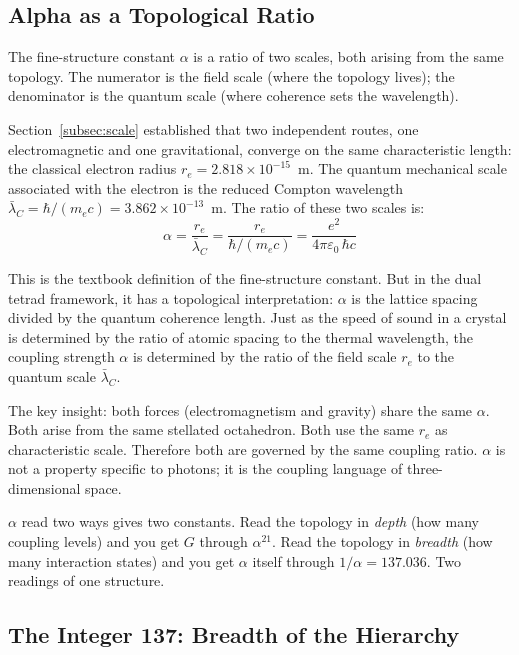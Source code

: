 \documentclass[aps,prd,preprint,superscriptaddress,showpacs,preprintnumbers,amsmath,amssymb,nofootinbib]{revtex4-2}
\begin{document}
\subsection{Alpha as a Topological Ratio}
\label{subsec:alpha-scale}

The fine-structure constant $\alpha$ is a ratio of two scales, both arising from the same topology. The numerator is the field scale (where the topology lives); the denominator is the quantum scale (where coherence sets the wavelength).

Section~\ref{subsec:scale} established that two independent routes, one electromagnetic and one gravitational, converge on the same characteristic length: the classical electron radius $r_e = 2.818 \times 10^{-15}$~m. The quantum mechanical scale associated with the electron is the reduced Compton wavelength $\bar{\lambda}_C = \hbar/(m_e c) = 3.862 \times 10^{-13}$~m. The ratio of these two scales is:
\begin{equation}
\alpha = \frac{r_e}{\bar{\lambda}_C} = \frac{r_e}{\hbar/(m_e c)} = \frac{e^2}{4\pi\varepsilon_0\,\hbar c}
\label{eq:alpha-ratio}
\end{equation}

This is the textbook definition of the fine-structure constant. But in the dual tetrad framework, it has a topological interpretation: $\alpha$ is the lattice spacing divided by the quantum coherence length. Just as the speed of sound in a crystal is determined by the ratio of atomic spacing to the thermal wavelength, the coupling strength $\alpha$ is determined by the ratio of the field scale $r_e$ to the quantum scale $\bar{\lambda}_C$.

The key insight: both forces (electromagnetism and gravity) share the same $\alpha$. Both arise from the same stellated octahedron. Both use the same $r_e$ as characteristic scale. Therefore both are governed by the same coupling ratio. $\alpha$ is not a property specific to photons; it is the coupling language of three-dimensional space.

$\alpha$ read two ways gives two constants. Read the topology in \emph{depth} (how many coupling levels) and you get $G$ through $\alpha^{21}$. Read the topology in \emph{breadth} (how many interaction states) and you get $\alpha$ itself through $1/\alpha = 137.036$. Two readings of one structure.

\subsection{The Integer 137: Breadth of the Hierarchy}
\label{subsec:breadth}
\end{document}

